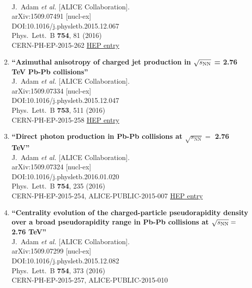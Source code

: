 \begin{enumerate}
  \\{}J.~Adam {\it et al.} [ALICE Collaboration].
  \\{}arXiv:1509.07491 [nucl-ex]
  \\{}DOI:10.1016/j.physletb.2015.12.067
  \\{}Phys.\ Lett.\ B {\bf 754}, 81 (2016)
  \\{}CERN-PH-EP-2015-262
\href{http://inspirehep.net/record/1394682}{HEP entry}
\item%
{\bf ``Azimuthal anisotropy of charged jet production in $\sqrt{s_{\rm NN}}$ = 2.76 TeV Pb-Pb collisions''}
  \\{}J.~Adam {\it et al.} [ALICE Collaboration].
  \\{}arXiv:1509.07334 [nucl-ex]
  \\{}DOI:10.1016/j.physletb.2015.12.047
  \\{}Phys.\ Lett.\ B {\bf 753}, 511 (2016)
  \\{}CERN-PH-EP-2015-258
\href{http://inspirehep.net/record/1394678}{HEP entry}
\item%
{\bf ``Direct photon production in Pb-Pb collisions at $\sqrt{s_\mathrm{NN}} =$ 2.76 TeV''}
  \\{}J.~Adam {\it et al.} [ALICE Collaboration].
  \\{}arXiv:1509.07324 [nucl-ex]
  \\{}DOI:10.1016/j.physletb.2016.01.020
  \\{}Phys.\ Lett.\ B {\bf 754}, 235 (2016)
  \\{}CERN-PH-EP-2015-254, ALICE-PUBLIC-2015-007
\href{http://inspirehep.net/record/1394677}{HEP entry}
\item%
{\bf ``Centrality evolution of the charged-particle pseudorapidity density over a broad pseudorapidity range in Pb-Pb collisions at $\sqrt{s_{\rm NN}} =$ 2.76 TeV''}
  \\{}J.~Adam {\it et al.} [ALICE Collaboration].
  \\{}arXiv:1509.07299 [nucl-ex]
  \\{}DOI:10.1016/j.physletb.2015.12.082
  \\{}Phys.\ Lett.\ B {\bf 754}, 373 (2016)
  \\{}CERN-PH-EP-2015-257, ALICE-PUBLIC-2015-010

\end{enumerate}
